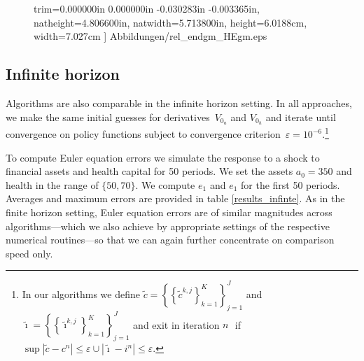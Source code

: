 \documentclass[a4paper,12pt]{article}%
\begin{document}
\begin{figure}[htb]
\begin{tabular}
{trim=0.000000in 0.000000in -0.030283in -0.003365in,
natheight=4.806600in,
natwidth=5.713800in,
height=6.0188cm,
width=7.027cm
]%
{Abbildungen/rel_endgm_HEgm.eps}%
}
\\
%
\end{tabular}
\label{graph_finte}%
\end{figure}%


\subsection{Infinite horizon}

Algorithms are also comparable in the infinite horizon setting. In all
approaches, we make the same initial guesses for derivatives~$V_{0_{a}}$ and
$V_{0_{h}}$ and iterate until convergence on policy functions subject to
convergence criterion~$\varepsilon=10^{-6}$.\footnote{In our algorithms we
define $\tilde{c}=\left\{  \left\{  \tilde{c}^{k,j}\right\}  _{k=1}%
^{K}\right\}  _{j=1}^{J}$ and $\tilde{\imath}=\left\{  \left\{  \tilde{\imath
}^{k,j}\right\}  _{k=1}^{K}\right\}  _{j=1}^{J}$ and exit in iteration
$n\,$\ if $\sup|\tilde{c}-c^{n}|\leq\varepsilon\cup|\tilde{\imath}-i^{n}%
|\leq\varepsilon.$}

To compute Euler equation errors we simulate the response to a shock to
financial assets and health capital for 50 periods. We set the assets
$a_{0}=350$ and health in the range of $\{50,70\}$. We compute $e_{1}$ and
$e_{1}$ for the first 50 periods. Averages and maximum errors are provided in
table \ref{results_infinte}. As in the finite horizon setting, Euler equation
errors are of similar magnitudes across algorithms---which we also achieve by
appropriate settings of the respective numerical routines---so that we can
again further concentrate on comparison speed only.
\end{document}
